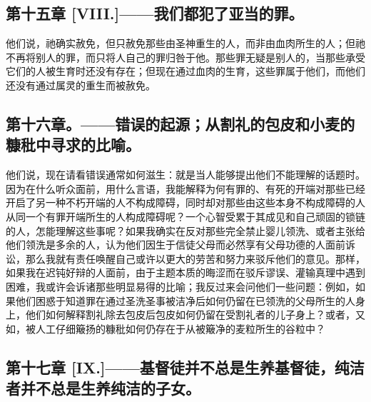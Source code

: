 
\subsection{第十五章 [VIII.]——我们都犯了亚当的罪。}

他们说，祂确实赦免，但只赦免那些由圣神重生的人，而非由血肉所生的人；但祂不再将别人的罪，而只将人自己的罪归咎于他。那些罪无疑是别人的，当那些承受它们的人被生育时还没有存在；但现在通过血肉的生育，这些罪属于他们，而他们还没有通过属灵的重生而被赦免。\par


\subsection{第十六章。——错误的起源；从割礼的包皮和小麦的糠秕中寻求的比喻。}

他们说，现在请看错误通常如何滋生：就是当人能够提出他们不能理解的话题时。因为在什么听众面前，用什么言语，我能解释为何有罪的、有死的开端对那些已经开启了另一种不朽开端的人不构成障碍，同时却对那些由这些本身不构成障碍的人从同一个有罪开端所生的人构成障碍呢？一个心智受累于其成见和自己顽固的锁链的人，怎能理解这些事呢？如果我确实在反对那些完全禁止婴儿领洗、或者主张给他们领洗是多余的人，认为他们因生于信徒父母而必然享有父母功德的人面前诉讼，那么我就有责任唤醒自己或许以更大的劳苦和努力来驳斥他们的意见。那样，如果我在迟钝好辩的人面前，由于主题本质的晦涩而在驳斥谬误、灌输真理中遇到困难，我或许会诉诸那些明显易得的比喻；我反过来会问他们一些问题：例如，如果他们困惑于知道罪在通过圣洗圣事被洁净后如何仍留在已领洗的父母所生的人身上，他们如何解释割礼除去包皮后包皮如何仍留在受割礼者的儿子身上？或者，又如，被人工仔细簸扬的糠秕如何仍存在于从被簸净的麦粒所生的谷粒中？\par


\subsection{第十七章 [IX.]——基督徒并不总是生养基督徒，纯洁者并不总是生养纯洁的子女。}

